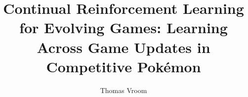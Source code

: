 \documentclass[10pt]{reportMaster}
\title{Continual Reinforcement Learning for Evolving Games: Learning Across Game Updates in Competitive Pokémon}
\author{Thomas Vroom}
\begin{document}
\maketitle



\tableofcontents

\newpage

\newpage

\newpage

\newpage

\newpage

\newpage

\newpage


\newpage
\sloppy
\printbibliography

\newpage

\end{document}
